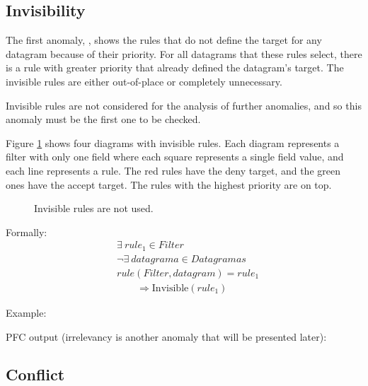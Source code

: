 \subsection{Invisibility}


The first anomaly, , shows the rules that do
not define the target for any datagram because of their priority. For all
datagrams that these rules select, there is a rule with greater priority that already
defined the datagram's target. The invisible rules are either out-of-place or
completely unnecessary.

Invisible rules are not considered for the analysis of further anomalies, and so
this anomaly must be the first one to be checked.

Figure \ref{fig:exrinvisible} shows four diagrams with invisible rules.
Each diagram represents a filter with only one field where each square
represents a single field value, and each line represents a rule. The red rules
have the deny target, and the green ones have the accept target. The rules with
the highest priority are on top.

\begin{figure}
	\caption{\label{fig:exrinvisible}Invisible rules are not used.}
\end{figure}

Formally:
\begin{align*}
	& \exists ~ rule_1 \in Filter \\
	& \lnot\exists ~ datagrama \in Datagramas \\
	& rule(Filter, datagram) = rule_1 \\
	& \qquad \Rightarrow \mbox{Invisible}(rule_1)
\end{align*}

Example:



PFC output (irrelevancy is another anomaly that will be presented later):





\subsection{Conflict}


